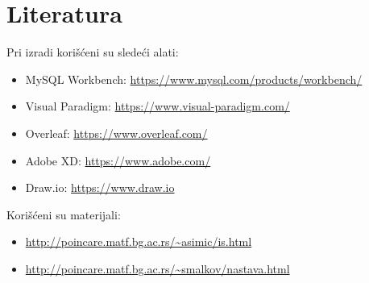 \section{Literatura}
Pri izradi korišćeni su sledeći alati:
\begin{itemize}
    \item MySQL Workbench: \url{https://www.mysql.com/products/workbench/}
    \item Visual Paradigm: \url{https://www.visual-paradigm.com/}
    \item Overleaf: \url{https://www.overleaf.com/}
    \item Adobe XD: \url{https://www.adobe.com/}
    \item Draw.io: \url{https://www.draw.io}
\end{itemize}
Korišćeni su materijali:
\begin{itemize}
    \item \url{http://poincare.matf.bg.ac.rs/~asimic/is.html}
    \item \url{http://poincare.matf.bg.ac.rs/~smalkov/nastava.html}
\end{itemize}
